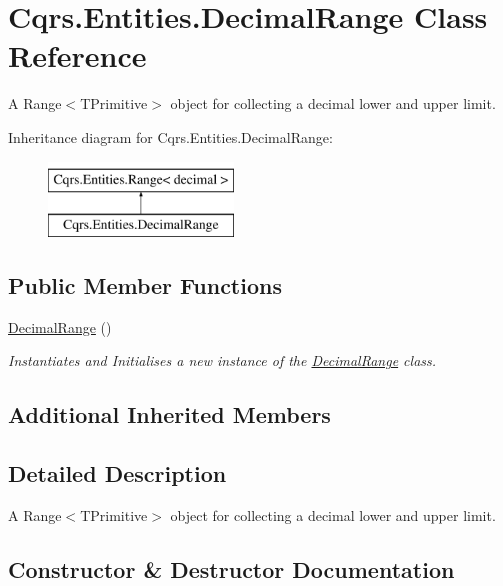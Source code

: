 \hypertarget{classCqrs_1_1Entities_1_1DecimalRange}{}\section{Cqrs.\+Entities.\+Decimal\+Range Class Reference}
\label{classCqrs_1_1Entities_1_1DecimalRange}


A Range$<$\+T\+Primitive$>$ object for collecting a decimal lower and upper limit.  


Inheritance diagram for Cqrs.\+Entities.\+Decimal\+Range\+:\begin{figure}[H]
\begin{center}
\leavevmode
\includegraphics[height=2.000000cm]{classCqrs_1_1Entities_1_1DecimalRange}
\end{center}
\end{figure}
\subsection*{Public Member Functions}
\begin{DoxyCompactItemize}
\item 
\hyperlink{classCqrs_1_1Entities_1_1DecimalRange_a6bc3dc9a228baeff240d1fa3528a13ed}{Decimal\+Range} ()
\begin{DoxyCompactList}\small\item\em Instantiates and Initialises a new instance of the \hyperlink{classCqrs_1_1Entities_1_1DecimalRange}{Decimal\+Range} class. \end{DoxyCompactList}\end{DoxyCompactItemize}
\subsection*{Additional Inherited Members}


\subsection{Detailed Description}
A Range$<$\+T\+Primitive$>$ object for collecting a decimal lower and upper limit. 



\subsection{Constructor \& Destructor Documentation}
\mbox{\label{classCqrs_1_1Entities_1_1DecimalRange_a6bc3dc9a228baeff240d1fa3528a13ed}} 
